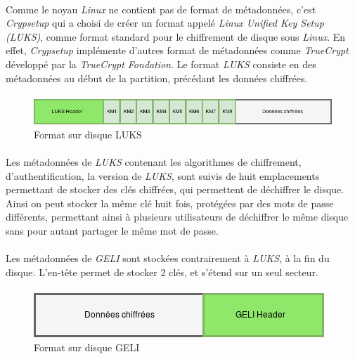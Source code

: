 \paragraph{}
Comme le noyau {\em Linux} ne contient pas de format de métadonnées, 
c'est {\em Crypsetup} qui a choisi de créer un format appelé {\em Linux 
Unified Key Setup ({\em LUKS})}, comme format standard pour le chiffrement de 
disque sous {\em Linux}. En effet, {\em Crypsetup} implémente d'autres format 
de métadonnées comme {\em TrueCrypt} développé par la 
{\em TrueCrypt Fondation}. 
Le format {\em LUKS} consiste en des métadonnées au début de la partition, 
précédant les données chiffrées.

\paragraph{}
\begin{figure}[h]
\centering
\includegraphics[width=.8\linewidth]{etat_art/format_disque_luks.png}
\caption{\label{fig:LUKSFormat}Format sur disque LUKS}
\end{figure}

\paragraph{}
Les métadonnées de {\em LUKS} contenant les algorithmes de chiffrement, 
d'authentification, la version de {\em LUKS}, sont suivis de huit emplacements 
permettant de stocker des clés chiffrées, qui permettent de déchiffrer le 
disque. Ainsi on peut stocker la même clé huit fois, protégées par des mots de 
passe différents, permettant ainsi à plusieurs utilisateurs de déchiffrer le 
même disque sans pour autant partager le même mot de passe.

\paragraph{}
Les métadonnées de {\em GELI} sont stockées contrairement à {\em LUKS}, 
à la fin du disque.
L'en-tête permet de stocker 2 clés, et s'étend sur un seul secteur.


\paragraph{}
\begin{figure}[h]
\centering
\includegraphics[width=.5\linewidth]{etat_art/format_disque_geli.png}
\caption{\label{fig:GELIFormat}Format sur disque GELI}
\end{figure}

